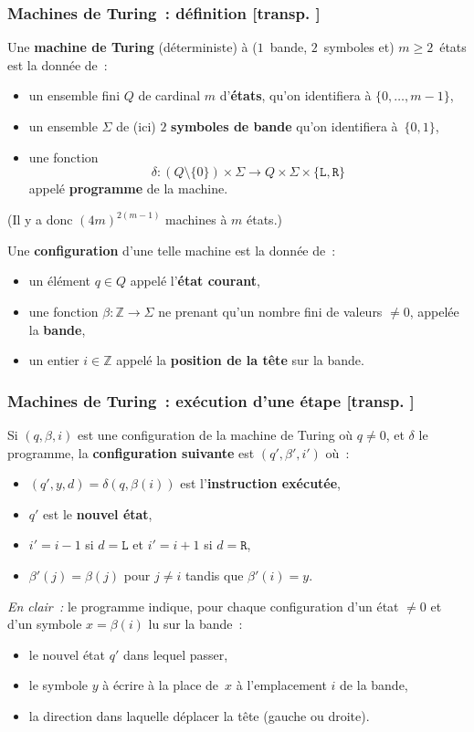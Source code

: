 \documentclass[mathserif,a4paper,aspectratio=169]{beamer}
\renewcommand{\frametitle}[1]{\subsubsection*{#1 {\footnotesize[transp. \insertframenumber]}}}
\begin{document}
\begin{frame}
\frametitle{Machines de Turing : définition}

Une \textbf{machine de Turing} (déterministe) à ($1$ bande,
$2$ symboles et) $m\geq 2$ états est la donnée de :
\begin{itemize}
\item un ensemble fini $Q$ de cardinal $m$ d'\textbf{états}, qu'on
  identifiera à $\{0,\ldots,m-1\}$,
\item un ensemble $\Sigma$ de (ici) $2$ \textbf{symboles de bande}
  qu'on identifiera à $\{0,1\}$,
\item une fonction
\[
\delta \colon (Q\setminus\{0\}) \times \Sigma \to Q \times \Sigma \times \{\texttt{L},\texttt{R}\}
\]
appelé \textbf{programme} de la machine.
\end{itemize}

{\footnotesize (Il y a donc $(4m)^{2(m-1)}$ machines à $m$ états.)\par}

\bigskip

Une \textbf{configuration} d'une telle machine est la donnée de :
\begin{itemize}
\item un élément $q \in Q$ appelé l'\textbf{état courant},
\item une fonction $\beta\colon \mathbb{Z} \to \Sigma$ ne prenant
  qu'\alert{un nombre fini} de valeurs $\neq 0$, appelée la
  \textbf{bande},
\item un entier $i \in \mathbb{Z}$ appelé la \textbf{position de la
  tête} sur la bande.
\end{itemize}

\end{frame}
%
\begin{frame}
\frametitle{Machines de Turing : exécution d'une étape}

Si $(q,\beta,i)$ est une configuration de la machine de Turing où
$q\neq 0$, et $\delta$ le programme, la \textbf{configuration
  suivante} est $(q',\beta',i')$ où :
\begin{itemize}
\item $(q',y,d) = \delta(q,\beta(i))$ est l'\textbf{instruction
  exécutée},
\item $q'$ est le \textbf{nouvel état},
\item $i' = i-1$ si $d=\texttt{L}$ et $i' = i+1$ si $d=\texttt{R}$,
\item $\beta'(j) = \beta(j)$ pour $j\neq i$ tandis que $\beta'(i) = y$.
\end{itemize}

\bigskip

\emph{En clair :} le programme indique, pour chaque configuration d'un
état $\neq 0$ et d'un symbole $x = \beta(i)$ lu sur la bande :
\begin{itemize}
\item le nouvel état $q'$ dans lequel passer,
\item le symbole $y$ à écrire à la place de $x$ à l'emplacement $i$ de
  la bande,
\item la direction dans laquelle déplacer la tête (gauche ou droite).
\end{itemize}

\end{frame}
\end{document}

